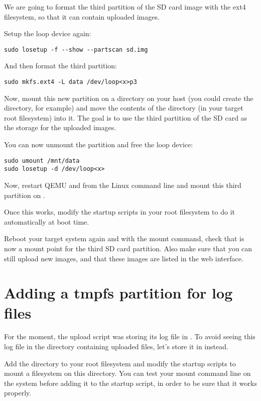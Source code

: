 We are going to format the third partition of the SD card image
with the ext4 filesystem, so that it can contain uploaded images.

Setup the loop device again:
\begin{verbatim}
sudo losetup -f --show --partscan sd.img
\end{verbatim}

And then format the third partition:

\begin{verbatim}
sudo mkfs.ext4 -L data /dev/loop<x>p3
\end{verbatim}

Now, mount this new partition on a directory on your host (you could
create the  directory, for example) and move the contents of the
 directory (in your target root filesystem) into
it. The goal is to use the third partition of the SD card as the storage
for the uploaded images.

You can now unmount the partition and free the loop device:
\begin{verbatim}
sudo umount /mnt/data
sudo losetup -d /dev/loop<x>
\end{verbatim}

Now, restart QEMU and from the Linux command line and
mount this third partition on .

Once this works, modify the startup scripts in your root filesystem
to do it automatically at boot time.

Reboot your target system again and with the mount command, check that
 is now a mount point for the third SD card
partition. Also make sure that you can still upload new images, and
that these images are listed in the web interface.

\section{Adding a tmpfs partition for log files}

For the moment, the upload script was storing its log file in
. To avoid seeing this log file in
the directory containing uploaded files, let's store it in
 instead.

Add the  directory to your root filesystem and modify
the startup scripts to mount a  filesystem on this
directory. You can test your  mount command line on the
system before adding it to the startup script, in order to be sure
that it works properly.


